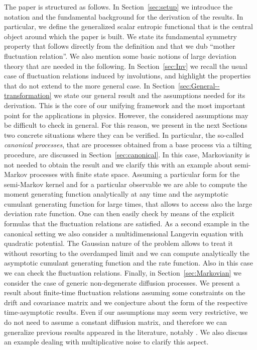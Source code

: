 \documentclass[a4paper,11pt]{article}
\numberwithin{equation}{section}
\begin{document}
The paper is structured as follows.
In Section~\ref{sec:setup}  we introduce the notation and the fundamental background for the derivation of the results. In particular, we define the generalized scalar entropic functional that is the central object around which the paper is built. We state its fundamental symmetry property that follows directly from the definition and that we dub ``mother fluctuation relation''. We also mention some basic notions of large deviation theory that are needed in the following. In Section~\ref{sec:Inv} we recall the usual case of fluctuation relations induced by involutions, and highlight the properties that do not extend to the more general case. In Section~\ref{sec:General--transformation} we state our general result and the assumptions needed for its derivation. This is the core of our unifying framework and the most important point for the applications in physics. However, the considered assumptions may be difficult to check in general. For this reason, we present in the next Sections two concrete situations where they can be verified. In particular, the so-called \emph{canonical processes}, that are processes obtained from a base process via a tilting procedure, are discussed in Section~\ref{sec:canonical}. In this case, Markovianity is not needed to obtain the result and we clarify this with an example about semi-Markov processes with finite state space. Assuming a particular form for the semi-Markov kernel and for a particular observable we are able to compute the moment generating function analytically at any time and the asymptotic cumulant generating function for large times, that allows to access also the large deviation rate function. One can then easily check by means of the explicit formulas that the fluctuation relations are satisfied. As a second example in the canonical setting we also consider a multidimensional Langevin equation with quadratic potential. The Gaussian nature of the problem allows to treat it without resorting to the overdamped limit and we can compute analytically the asymptotic cumulant generating function and the rate function. Also in this case we can check the fluctuation relations. Finally, in Section~\ref{sec:Markovian} we consider the case of generic non-degenerate diffusion processes. We present a result about finite-time fluctuation relations assuming some constraints on the drift and covariance matrix and we conjecture about the form of the respective time-asymptotic results. Even if our assumptions may seem very restrictive, we do not need to assume a constant diffusion matrix, and therefore we can generalize previous results appeared in the literature, notably \cite{PRG15}. We also discuss an example dealing with multiplicative noise to clarify this aspect.
\end{document}
